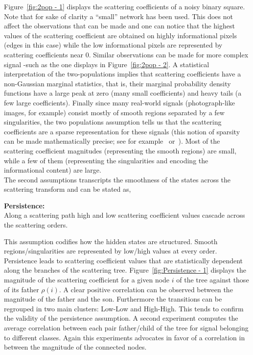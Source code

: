 \documentclass[a4paper,11pt]{report}
\begin{document}
		Figure~\ref{fig:2pop - 1} displays the scattering coefficients of a noisy binary square. Note that for sake of clarity a ``small'' network has been used. This does not affect the observations that can be made and one can notice that the highest values of the scattering coefficient are obtained on highly informational pixels (edges in this case) while the low informational pixels are represented by scattering coefficients near $0$. Similar observations can be made for more complex signal -such as the one displays in Figure~\ref{fig:2pop - 2}. A statistical interpretation of the two-populations implies that scattering coefficients have a non-Gaussian marginal statistics, that is, their marginal probability density functions have a large peak at zero (many small coefficients) and heavy tails (a few large coefficients). Finally since many real-world signals (photograph-like images, for example) consist mostly of smooth regions separated by a few singularities, the two populations assumption tells us that the scattering coefficients are a sparse representation for these signals (this notion of sparsity can be made mathematically precise; see for example~\cite{donoho1993unconditional} or~\cite{devore1992image}). Most of the scattering coefficient magnitudes (representing the smooth regions) are small, while a few of them (representing the singularities and encoding the informational content) are large.\\
		
		The second assumptions transcripts the smoothness of the states across the scattering transform and can be stated as,\\
		
		\begin{assumption}\textbf{Persistence:}\\
		  Along a scattering path high and low scattering coefficient values cascade across the scattering orders.\\
		  \label{assum:Persistence}
		\end{assumption}

		This assumption codifies how the hidden states are structured. Smooth regions/singularities are represented by low/high values at every order. Persistence leads to scattering coefficient values that are statistically dependent along the branches of the scattering tree. Figure~\ref{fig:Persistence - 1} displays the magnitude of the scattering coefficient for a given node $i$ of the tree against those of its father $\rho(i)$. A clear positive correlation can be observed between the magnitude of the father and the son. Furthermore the transitions can be regrouped in two main clusters: Low-Low and High-High. This tends to confirm the validity of the persistence assumption. A second experiment computes the average correlation between each pair father/child of the tree for signal belonging to different classes. Again this experiments advocates in favor of a correlation in between the magnitude of the connected nodes.  
		
\end{document}
